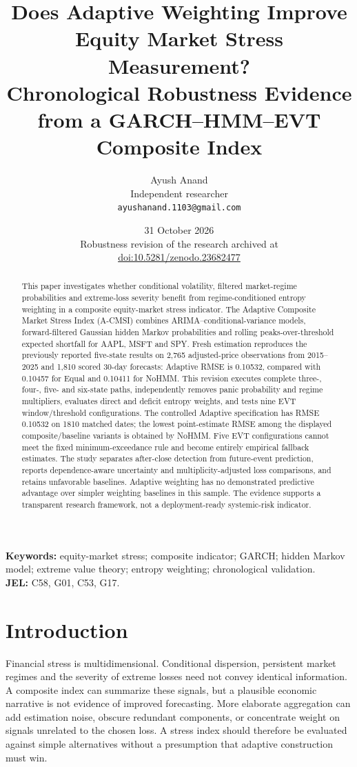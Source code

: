 \documentclass[11pt]{article}
\title{Does Adaptive Weighting Improve Equity Market Stress Measurement?\\
Chronological Robustness Evidence from a GARCH--HMM--EVT Composite Index}
\author{Ayush Anand\\\small Independent researcher\\\small\texttt{ayushanand.1103@gmail.com}}
\date{31 October 2026\\\small Robustness revision of the research archived at\\
\small\href{https://doi.org/10.5281/zenodo.23682477}{doi:10.5281/zenodo.23682477}}
\begin{document}
\maketitle
\begin{abstract}
This paper investigates whether conditional volatility, filtered market-regime probabilities and extreme-loss
severity benefit from regime-conditioned entropy weighting in a composite equity-market stress indicator.
The Adaptive Composite Market Stress Index (A-CMSI) combines ARIMA--conditional-variance models,
forward-filtered Gaussian hidden Markov probabilities and rolling peaks-over-threshold expected shortfall
for AAPL, MSFT and SPY. Fresh estimation reproduces the previously reported five-state results on
2,765 adjusted-price observations from 2015--2025 and 1,810 scored 30-day forecasts: Adaptive RMSE is
0.10532, compared with 0.10457 for Equal and 0.10411 for NoHMM. This revision executes complete
three-, four-, five- and six-state paths, independently removes panic probability and regime multipliers,
evaluates direct and deficit entropy weights, and tests nine EVT window/threshold configurations.
The controlled Adaptive specification has RMSE 0.10532 on 1810 matched dates; the lowest point-estimate RMSE among the displayed composite/baseline variants is obtained by NoHMM. Five EVT configurations cannot meet the fixed minimum-exceedance rule and become entirely empirical fallback estimates.
The study separates after-close detection from future-event prediction, reports dependence-aware
uncertainty and multiplicity-adjusted loss comparisons, and retains unfavorable baselines.
Adaptive weighting has no demonstrated predictive advantage over simpler weighting baselines in this
sample. The evidence supports a transparent research framework, not a deployment-ready systemic-risk indicator.
\end{abstract}
\textbf{Keywords:} equity-market stress; composite indicator; GARCH; hidden Markov model;
extreme value theory; entropy weighting; chronological validation.\\
\textbf{JEL:} C58, G01, C53, G17.

\section{Introduction}
Financial stress is multidimensional. Conditional dispersion, persistent market regimes and the severity
of extreme losses need not convey identical information. A composite index can summarize these signals,
but a plausible economic narrative is not evidence of improved forecasting. More elaborate aggregation
can add estimation noise, obscure redundant components, or concentrate weight on signals unrelated to
the chosen loss. A stress index should therefore be evaluated against simple alternatives without a
presumption that adaptive construction must win.
\end{document}
